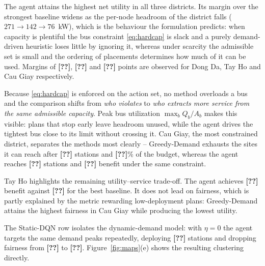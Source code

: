 \documentclass[graybox]{svmult}
\newcommand{\TODO}[1]{\textbf{[??]}}
\begin{document}
The agent attains the highest net utility in all three districts. Its margin over
the strongest baseline widens as the per-node headroom of the district falls
($271\rightarrow142\rightarrow76$~kW), which is the behaviour the formulation
predicts: when capacity is plentiful the bus constraint \eqref{eq:hardcap} is
slack and a purely demand-driven heuristic loses little by ignoring it, whereas
under scarcity the admissible set is small and the ordering of placements
determines how much of it can be used. Margins of \TODO{}, \TODO{} and \TODO{}
points are observed for Dong Da, Tay Ho and Cau Giay respectively.

Because \eqref{eq:hardcap} is enforced on the action set, no method overloads a
bus and the comparison shifts from \emph{who violates} to \emph{who extracts more
service from the same admissible capacity}. Peak bus utilization
$\max_b Q_b/A_b$ makes this visible: plans that stop early leave headroom unused,
while the agent drives the tightest bus close to its limit without crossing it.
Cau Giay, the most constrained district, separates the methods most clearly --
Greedy-Demand exhausts the sites it can reach after \TODO{} stations and
\TODO{}\% of the budget, whereas the agent reaches \TODO{} stations and \TODO{}
benefit under the same constraint.

Tay Ho highlights the remaining utility--service trade-off. The agent achieves
\TODO{} benefit against \TODO{} for the best baseline. It does not lead on
fairness, which is partly explained by the metric rewarding low-deployment plans:
Greedy-Demand attains the highest fairness in Cau Giay while producing the lowest
utility.

The Static-DQN row isolates the dynamic-demand model: with $\eta=0$ the agent
targets the same demand peaks repeatedly, deploying \TODO{} stations and dropping
fairness from \TODO{} to \TODO{}. Figure~\ref{fig:maps}(e) shows the resulting
clustering directly.
\end{document}
